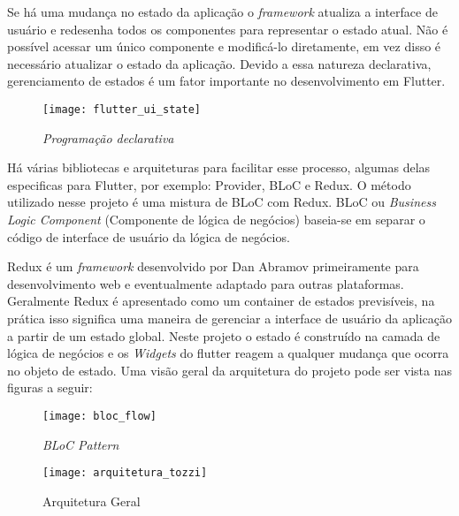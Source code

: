 Se há uma mudança no estado da aplicação o \textit{framework} atualiza a interface de usuário e redesenha todos os componentes para representar o estado atual. Não é possível acessar um único componente e modificá-lo diretamente, em vez disso é necessário atualizar o estado da aplicação. Devido a essa natureza declarativa, gerenciamento de estados é um fator importante no desenvolvimento em Flutter.

\begin{figure}[H]
	\caption{\label{flutter_ui_state}\textit{Programação declarativa}}
	\begin{center}
		\texttt{[image: flutter\_ui\_state]}
	\end{center}	
\end{figure}

Há várias bibliotecas e arquiteturas para facilitar esse processo, algumas delas especificas para Flutter, por exemplo: Provider, BLoC e Redux. O método utilizado nesse projeto é uma mistura de BLoC com Redux. BLoC ou \textit{Business Logic Component} (Componente de lógica de negócios) baseia-se em separar o código de interface de usuário da lógica de negócios. 


Redux é um \textit{framework} desenvolvido por Dan Abramov primeiramente para desenvolvimento web e eventualmente adaptado para outras plataformas. Geralmente Redux é apresentado como um container de estados previsíveis, na prática isso significa uma maneira de gerenciar a interface de usuário da aplicação a partir de um estado global. Neste projeto o estado é construído na camada de lógica de negócios e os \textit{Widgets} do flutter reagem a qualquer mudança que ocorra no objeto de estado. Uma visão geral da arquitetura do projeto pode ser vista nas figuras a seguir:

\begin{figure}[H]
	\caption{\label{fig:bloc_flow}\textit{BLoC Pattern}}
	\begin{center}
		\texttt{[image: bloc\_flow]}
	\end{center}	
\end{figure}

\begin{figure}[H]
	\caption{\label{fig:arquitetura_tozzi}Arquitetura Geral}
	\begin{center}
		\texttt{[image: arquitetura\_tozzi]}
	\end{center}
\end{figure}

